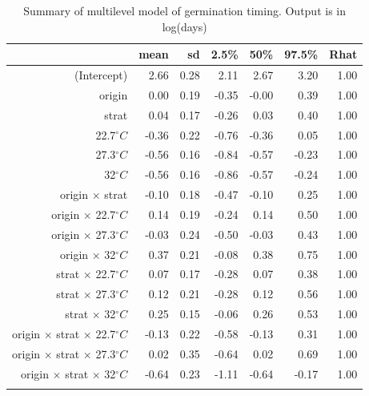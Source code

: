 \documentclass[12pt]{article}\usepackage[]{graphicx}\usepackage[]{color}
\begin{document}
\begin{longtable}{rrrrrrr}
\caption{Summary of multilevel model of germination timing. Output is in log(days)} \\ 
  & mean & sd & 2.5\% & 50\% & 97.5\% & Rhat \\ 
  \hline
(Intercept) & 2.66 & 0.28 & 2.11 & 2.67 & 3.20 & 1.00 \\ 
  origin & 0.00 & 0.19 & -0.35 & -0.00 & 0.39 & 1.00 \\ 
  strat & 0.04 & 0.17 & -0.26 & 0.03 & 0.40 & 1.00 \\ 
  22.7$^\circ C$ & -0.36 & 0.22 & -0.76 & -0.36 & 0.05 & 1.00 \\ 
  27.3$^\circ C$ & -0.56 & 0.16 & -0.84 & -0.57 & -0.23 & 1.00 \\ 
  32$^\circ C$ & -0.56 & 0.16 & -0.86 & -0.57 & -0.24 & 1.00 \\ 
  origin $\times$ strat & -0.10 & 0.18 & -0.47 & -0.10 & 0.25 & 1.00 \\ 
  origin $\times$ 22.7$^\circ C$ & 0.14 & 0.19 & -0.24 & 0.14 & 0.50 & 1.00 \\ 
  origin $\times$ 27.3$^\circ C$ & -0.03 & 0.24 & -0.50 & -0.03 & 0.43 & 1.00 \\ 
  origin $\times$ 32$^\circ C$ & 0.37 & 0.21 & -0.08 & 0.38 & 0.75 & 1.00 \\ 
  strat $\times$ 22.7$^\circ C$ & 0.07 & 0.17 & -0.28 & 0.07 & 0.38 & 1.00 \\ 
  strat $\times$ 27.3$^\circ C$ & 0.12 & 0.21 & -0.28 & 0.12 & 0.56 & 1.00 \\ 
  strat $\times$ 32$^\circ C$ & 0.25 & 0.15 & -0.06 & 0.26 & 0.53 & 1.00 \\ 
  origin $\times$ strat $\times$ 22.7$^\circ C$ & -0.13 & 0.22 & -0.58 & -0.13 & 0.31 & 1.00 \\ 
  origin $\times$ strat $\times$ 27.3$^\circ C$ & 0.02 & 0.35 & -0.64 & 0.02 & 0.69 & 1.00 \\ 
  origin $\times$ strat $\times$ 32$^\circ C$ & -0.64 & 0.23 & -1.11 & -0.64 & -0.17 & 1.00 \\ 
  \hline
\label{tab:mod_time}
\end{longtable}
\end{document}
